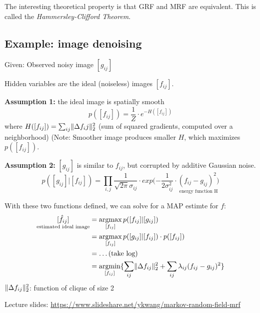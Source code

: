 \documentclass{scrartcl}
\DeclareMathOperator*{\argmin}{argmin} %
\DeclareMathOperator*{\argmax}{argmax} %
\DeclarePairedDelimiter\norm{\lVert}{\rVert}%
\begin{document}
The interesting theoretical property is that GRF and MRF are equivalent. This is called the \textit{Hammersley-Clifford Theorem}.

\bigbreak

\subsection{Example: image denoising}
Given: Observed noisy image \([g_{ij}]\)

Hidden variables are the ideal (noiseless) images \([f_{ij}]\).

\textbf{Assumption 1:} the ideal image is spatially smooth \[p([f_{ij}]) = \frac{1}{Z} \cdot e^{-H([f_{ij}])}\] where \(H([f_{ij}]) = \sum_{ij} \norm{\Delta f_ij}_2^2\) (sum of squared gradients, computed over a neighborhood) (Note: Smoother image produces smaller \(H\), which maximizes \(p([f_{ij}])\).

\textbf{Assumption 2:} \([g_{ij}]\) is similar to \(f_{ij}\), but corrupted by additive Gaussian noise.
\[ p([g_{ij}]|[f_{ij}]) = \prod_{i,j} \frac{1}{\sqrt{2\pi} \sigma_{ij}} \cdot exp(-\frac{1}{2\sigma_{ij}^2} \cdot \underset{\text{energy function H}}{(f_{ij} - g_{ij})^2)}\]

With these two functions defined, we can solve for a MAP estimte for \(f\): 
\begin{align*}
    \underset{\text{estimated ideal image}}{[\hat{f}_{ij}]} &= \argmax_{[f_{ij}]} p([f_{ij}]|[g_{ij}])\\
    &= \argmax_{[f_{ij}]} p([g_{ij}]|[f_{ij}]) \cdot p([f_{ij}])\\
    &= \dots \text{(take log)}\\
    &= \argmin_{[f_{ij}]} \{\sum_{ij} \norm{\Delta f_{ij}}_2^2 + \sum_{ij} \lambda_{ij}(f_{ij} - g_{ij})^2\}
\end{align*}
\(\norm{\Delta f_{ij}}_2^2\): function of clique of size 2

Lecture slides: \url{https://www.slideshare.net/ykwang/markov-random-field-mrf} 
\end{document}
